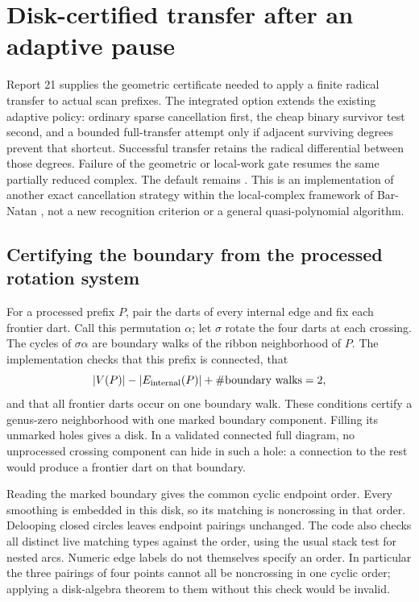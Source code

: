 \section{Disk-certified transfer after an adaptive pause}
\label{sec:disk-transfer-integration}

Report 21 supplies the geometric certificate needed to apply a finite radical
transfer to actual scan prefixes. The integrated option
 extends the existing adaptive policy:
ordinary sparse cancellation first, the cheap binary survivor test second,
and a bounded full-transfer attempt only if adjacent surviving degrees prevent
that shortcut. Successful transfer retains the radical differential between
those degrees. Failure of the geometric or local-work gate resumes the same
partially reduced complex. The default remains .
This is an implementation of another exact cancellation strategy within the
local-complex framework of Bar-Natan \cite{barnatan}, not a new recognition
criterion or a general quasi-polynomial algorithm.

\subsection{Certifying the boundary from the processed rotation system}
For a processed prefix $P$, pair the darts of every internal edge and fix each
frontier dart. Call this permutation $\alpha$; let $\sigma$ rotate the four
darts at each crossing. The cycles of $\sigma\alpha$ are boundary walks of
the ribbon neighborhood of $P$. The implementation checks that this prefix
is connected, that
\[
 |V(P)|-|E_{\rm internal}(P)|+\#\text{boundary walks}=2,
\]
and that all frontier darts occur on one boundary walk. These conditions
certify a genus-zero neighborhood with one marked boundary component.
Filling its unmarked holes gives a disk. In a validated connected full
diagram, no unprocessed crossing component can hide in such a hole: a
connection to the rest would produce a frontier dart on that boundary.

Reading the marked boundary gives the common cyclic endpoint order. Every
smoothing is embedded in this disk, so its matching is noncrossing in that
order. Delooping closed circles leaves endpoint pairings unchanged. The code
also checks all distinct live matching types against the order, using the
usual stack test for nested arcs. Numeric edge labels do not themselves
specify an order. In particular the three pairings of four points cannot all
be noncrossing in one cyclic order; applying a disk-algebra theorem to them
without this check would be invalid.

